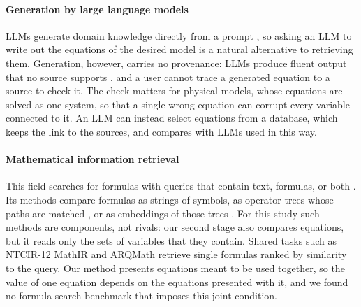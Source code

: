\paragraph{Generation by large language models} LLMs generate domain knowledge directly from a
prompt \citep{GPT3}, so asking an LLM to write out the equations of the desired model is a natural
alternative to retrieving them. Generation, however, carries no provenance: LLMs produce fluent
output that no source supports \citep{Hallucination}, and a user cannot trace a generated equation
to a source to check it. The check matters for physical models, whose equations are solved as one
system, so that a single wrong equation can corrupt every variable connected to it. An LLM can
instead select equations from a database, which keeps the link to the sources, and
 compares \ours{} with LLMs used in this way.

\paragraph{Mathematical information retrieval} This field searches for formulas with queries that
contain text, formulas, or both \citep{MathSurvey}. Its methods compare
formulas as strings of symbols, as operator trees whose paths are matched \citep{Approach0}, or as
embeddings of those trees \citep{TangentCFT}. For this study such methods are components, not
rivals: our second stage also compares equations, but it reads only the sets of variables that
they contain. Shared tasks such as NTCIR-12 MathIR \citep{NTCIR12} and ARQMath \citep{ARQMath}
retrieve single formulas ranked by similarity to the query. Our method presents equations meant to
be used together, so the value of one equation depends on the equations presented with it, and we
found no formula-search benchmark that imposes this joint condition.
